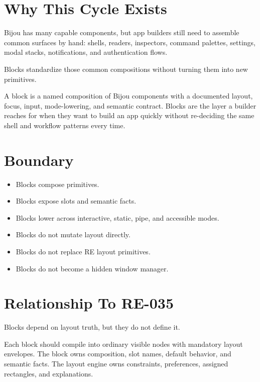 \section{Why This Cycle Exists}\label{record-128-why-this-cycle-exists}

Bijou has many capable components, but app builders still need to assemble common surfaces by hand: shells, readers, inspectors, command palettes, settings, modal stacks, notifications, and authentication flows.

Blocks standardize those common compositions without turning them into new primitives.

A block is a named composition of Bijou components with a documented layout, focus, input, mode-lowering, and semantic contract. Blocks are the layer a builder reaches for when they want to build an app quickly without re-deciding the same shell and workflow patterns every time.

\section{Boundary}\label{record-128-boundary}

\begin{itemize}
\tightlist
\item
  Blocks compose primitives.
\item
  Blocks expose slots and semantic facts.
\item
  Blocks lower across interactive, static, pipe, and accessible modes.
\item
  Blocks do not mutate layout directly.
\item
  Blocks do not replace RE layout primitives.
\item
  Blocks do not become a hidden window manager.
\end{itemize}

\section{Relationship To RE-035}\label{record-128-relationship-to-re-035}

Blocks depend on layout truth, but they do not define it.

Each block should compile into ordinary visible nodes with mandatory layout envelopes. The block owns composition, slot names, default behavior, and semantic facts. The layout engine owns constraints, preferences, assigned rectangles, and explanations.

